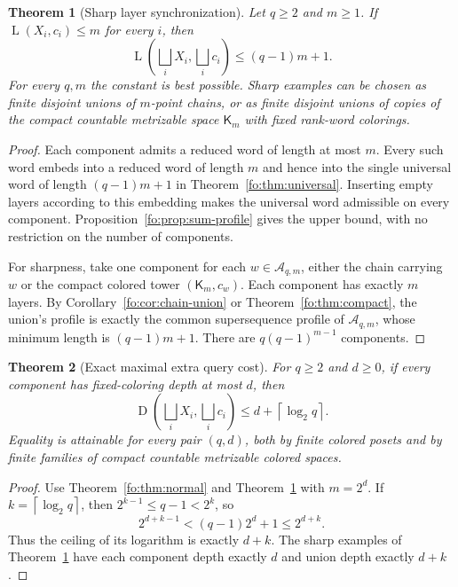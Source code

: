 \documentclass[11pt,letterpaper]{article}
\numberwithin{equation}{section}
\newtheorem{theorem}{Theorem}[section]
\theoremstyle{definition}
\theoremstyle{remark}
\theoremstyle{definition}
\newcommand{\ceil}[1]{\left\lceil#1\right\rceil}
\newcommand{\A}{\mathcal A}
\newcommand{\depth}{\operatorname{D}}
\newcommand{\layers}{\operatorname{L}}
\newcommand{\Tw}{\mathsf K}
\begin{document}
\begin{theorem}[Sharp layer synchronization]\label{fo:thm:sum-layers}
Let $q\ge2$ and $m\ge1$. If $\layers(X_i,c_i)\le m$ for every $i$, then
\begin{equation}\label{fo:eq:sum-layers}
 \layers\!\left(\bigsqcup_i X_i,\bigsqcup_i c_i\right)\le(q-1)m+1.
\end{equation}
For every $q,m$ the constant is best possible. Sharp examples can be chosen as
finite disjoint unions of $m$-point chains, or as finite disjoint unions of
copies of the compact countable metrizable space $\Tw_m$ with fixed rank-word
colorings.
\end{theorem}
\begin{proof}
Each component admits a reduced word of length at most $m$. Every such word
embeds into a reduced word of length $m$ and hence into the single universal
word of length $(q-1)m+1$ in Theorem~\ref{fo:thm:universal}. Inserting empty layers
according to this embedding makes the universal word admissible on every
component. Proposition~\ref{fo:prop:sum-profile} gives the upper bound, with no
restriction on the number of components.

For sharpness, take one component for each $w\in\A_{q,m}$, either the chain
carrying $w$ or the compact colored tower $(\Tw_m,c_w)$. Each component has exactly
$m$ layers. By Corollary~\ref{fo:cor:chain-union} or
Theorem~\ref{fo:thm:compact}, the union's profile is exactly the common
supersequence profile of $\A_{q,m}$, whose minimum length is $(q-1)m+1$.
There are $q(q-1)^{m-1}$ components.
\end{proof}

\begin{theorem}[Exact maximal extra query cost]\label{fo:thm:sum-depth}
For $q\ge2$ and $d\ge0$, if every component has fixed-coloring depth at most $d$,
then
\begin{equation}\label{fo:eq:sum-depth}
 \depth\!\left(\bigsqcup_iX_i,\bigsqcup_ic_i\right)
 \le d+\ceil{\log_2q}.
\end{equation}
Equality is attainable for every pair $(q,d)$, both by finite colored posets and
by finite families of compact countable metrizable colored spaces.
\end{theorem}
\begin{proof}
Use Theorem~\ref{fo:thm:normal} and Theorem~\ref{fo:thm:sum-layers} with $m=2^d$.
If $k=\ceil{\log_2q}$, then $2^{k-1}\le q-1<2^k$, so
\[
 2^{d+k-1}<(q-1)2^d+1\le2^{d+k}.
\]
Thus the ceiling of its logarithm is exactly $d+k$. The sharp examples of
Theorem~\ref{fo:thm:sum-layers} have each component depth exactly $d$ and union
depth exactly $d+k$.
\end{proof}
\end{document}
